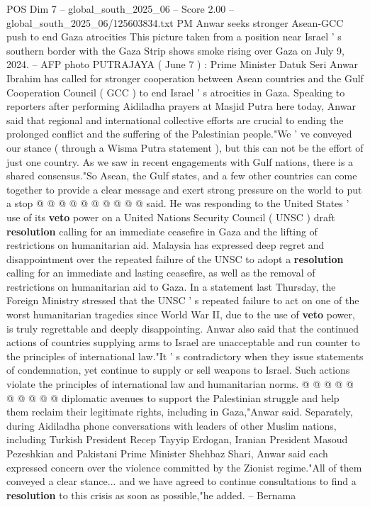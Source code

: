 \begin{textsample}{POS Dim 7 – global\_south\_2025\_06 – Score 2.00 – global\_south\_2025\_06/125603834.txt}  \label{ex:f7_pos_174}
PM Anwar seeks stronger Asean-GCC push to end Gaza atrocities This picture taken from a position near Israel ' s southern border with the Gaza Strip shows smoke rising over Gaza on July 9, 2024. -- AFP photo PUTRAJAYA ( June 7 ) : Prime Minister Datuk Seri Anwar Ibrahim has called for stronger cooperation between Asean countries and the Gulf Cooperation Council ( GCC ) to end Israel ' s atrocities in Gaza.
Speaking to reporters after performing Aidiladha prayers at Masjid Putra here today, Anwar said that regional and international collective efforts are crucial to ending the prolonged conflict and the suffering of the Palestinian people."We ' ve conveyed our stance ( through a Wisma Putra statement ), but this can not be the effort of just one country.
As we saw in recent engagements with Gulf nations, there is a shared consensus."So Asean, the Gulf states, and a few other countries can come together to provide a clear message and exert strong pressure on the world to put a stop @ @ @ @ @ @ @ @ @ @ said.
He was responding to the United States ' use of its \textbf{veto} power on a United Nations Security Council ( UNSC ) draft \textbf{resolution} calling for an immediate ceasefire in Gaza and the lifting of restrictions on humanitarian aid.
Malaysia has expressed deep regret and disappointment over the repeated failure of the UNSC to adopt a \textbf{resolution} calling for an immediate and lasting ceasefire, as well as the removal of restrictions on humanitarian aid to Gaza.
In a statement last Thursday, the Foreign Ministry stressed that the UNSC ' s repeated failure to act on one of the worst humanitarian tragedies since World War II, due to the use of \textbf{veto} power, is truly regrettable and deeply disappointing.
Anwar also said that the continued actions of countries supplying arms to Israel are unacceptable and run counter to the principles of international law."It ' s contradictory when they issue statements of condemnation, yet continue to supply or sell weapons to Israel.
Such actions violate the principles of international law and humanitarian norms. @ @ @ @ @ @ @ @ @ @ diplomatic avenues to support the Palestinian struggle and help them reclaim their legitimate rights, including in Gaza,"Anwar said.
Separately, during Aidiladha phone conversations with leaders of other Muslim nations, including Turkish President Recep Tayyip Erdogan, Iranian President Masoud Pezeshkian and Pakistani Prime Minister Shehbaz Shari, Anwar said each expressed concern over the violence committed by the Zionist regime."All of them conveyed a clear stance... and we have agreed to continue consultations to find a \textbf{resolution} to this crisis as soon as possible,"he added. -- Bernama

\end{textsample}
